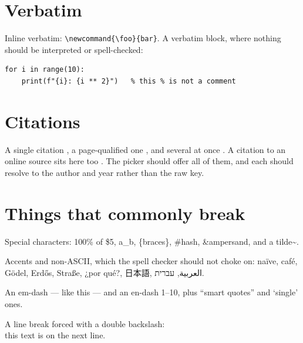\documentclass[11pt,a4paper]{article}
\begin{document}
\section{Verbatim}
\label{sec:code}

Inline verbatim: \verb|\newcommand{\foo}{bar}|. A verbatim block, where nothing should be
interpreted or spell-checked:

\begin{verbatim}
for i in range(10):
    print(f"{i}: {i ** 2}")   % this % is not a comment
\end{verbatim}

\section{Citations}
\label{sec:cites}

A single citation \cite{knuth1984}, a page-qualified one \cite[p.~42]{lamport1994}, and
several at once \cite{mittelbach2004, typst2023, curry1930}. A citation to an online source
sits here too \cite{unicode2024}. The picker should offer all of them, and each should
resolve to the author and year rather than the raw key.

\section{Things that commonly break}
\label{sec:edge}

Special characters: 100\% of \$5, a\_b, \{braces\}, \#hash, \&ampersand, and a tilde\textasciitilde{}.

Accents and non-ASCII, which the spell checker should not choke on: naïve, café, Gödel,
Erdős, Straße, ¿por qué?, 日本語, العربية, עברית.

An em-dash --- like this --- and an en-dash 1--10, plus ``smart quotes'' and `single' ones.

A line break forced with a double backslash: \\
this text is on the next line.



\end{document}
